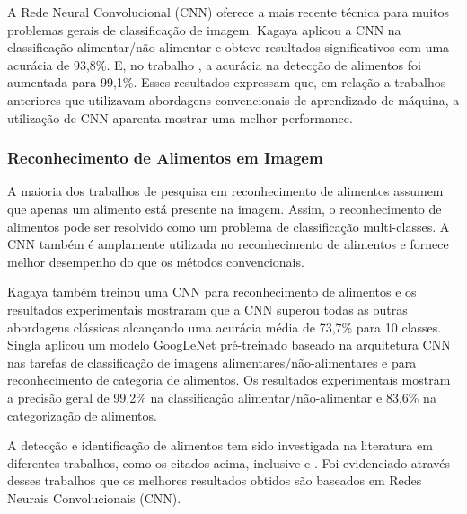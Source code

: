 A Rede Neural Convolucional (CNN) oferece a mais recente técnica para muitos problemas gerais de classificação de imagem. Kagaya \cite{kagaya2014food} aplicou a CNN na classificação alimentar/não-alimentar e obteve resultados significativos com uma acurácia de 93,8\%. E, no trabalho \cite{kagaya2015highly}, a acurácia na detecção de alimentos foi aumentada para 99,1\%. Esses resultados expressam que, em relação a trabalhos anteriores que utilizavam abordagens convencionais de aprendizado de máquina, a utilização de CNN aparenta mostrar uma melhor performance.

\subsubsection{Reconhecimento de Alimentos em Imagem}
A maioria dos trabalhos de pesquisa em reconhecimento de alimentos assumem que apenas um alimento está presente na imagem. Assim, o reconhecimento de alimentos pode ser resolvido como um problema de classificação multi-classes. A CNN também é amplamente utilizada no reconhecimento de alimentos e fornece melhor desempenho do que os métodos convencionais. 

Kagaya \cite{kagaya2014food} também treinou uma CNN para reconhecimento de alimentos e os resultados experimentais mostraram que a CNN superou todas as outras abordagens clássicas alcançando uma acurácia média de 73,7\% para 10 classes. Singla \cite{singla2016food} aplicou um modelo GoogLeNet pré-treinado baseado na arquitetura CNN nas tarefas de classificação de imagens alimentares/não-alimentares e para reconhecimento de categoria de alimentos. Os resultados experimentais mostram a precisão geral de 99,2\% na classificação alimentar/não-alimentar e 83,6\% na categorização de alimentos. 

A detecção e identificação de alimentos tem sido investigada na literatura em diferentes trabalhos, como os citados acima, inclusive \cite{aguilar2017food} e \cite{pouladzadeh2017cloud}.  Foi evidenciado através desses trabalhos que os melhores resultados obtidos são baseados em Redes Neurais Convolucionais (CNN).

